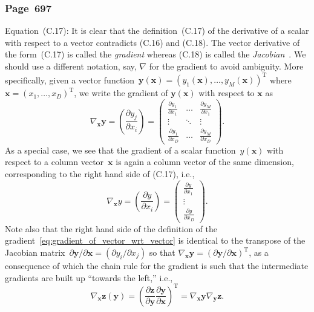 \documentclass[12pt,a4paper]{article}
\newcommand{\erratum}[1]{\subsubsection*{#1}}
\begin{document}
\erratum{Page~697}
Equation~(C.17):
It is clear that the definition~(C.17) of the derivative of a scalar with respect to a vector
contradicts (C.16) and (C.18).
The vector derivative of the form~(C.17) is called the \emph{gradient}
whereas (C.18) is called the \emph{Jacobian}~\citep{Minka:OldNewMatrixAlgebra}.
We should use a different notation, say, $\nabla$ for the gradient to avoid ambiguity.
More specifically, given a vector function~$\mathbf{y}(\mathbf{x}) =
\left(y_1(\mathbf{x}), \dots, y_M(\mathbf{x})\right)^{\operatorname{T}}$
where $\mathbf{x} = \left(x_1, \dots, x_D \right)^{\operatorname{T}}$,
we write the gradient of $\mathbf{y}(\mathbf{x})$ with respect to $\mathbf{x}$ as
\begin{equation}
\nabla_{\mathbf{x}} \mathbf{y} = \left( \frac{\partial y_j}{\partial x_i} \right) =
\begin{pmatrix}
\frac{\partial y_1}{\partial x_1} & \hdots & \frac{\partial y_M}{\partial x_1} \\
\vdots & \ddots & \vdots \\
\frac{\partial y_1}{\partial x_D} & \hdots & \frac{\partial y_M}{\partial x_D}
\end{pmatrix} .
\label{eq:gradient_of_vector_wrt_vector}
\end{equation}
As a special case, we see that the gradient of a scalar function~$y(\mathbf{x})$ with respect to
a column vector~$\mathbf{x}$ is again a column vector of the same dimension,
corresponding to the right hand side of (C.17), i.e.,
\begin{equation}
\nabla_{\mathbf{x}} y = \left( \frac{\partial y}{\partial x_i} \right) =
\begin{pmatrix}
\frac{\partial y}{\partial x_1} \\
\vdots  \\
\frac{\partial y}{\partial x_D}
\end{pmatrix} .
\end{equation}
Note also that the right hand side of the definition of
the gradient~\eqref{eq:gradient_of_vector_wrt_vector} is identical to
the transpose of the Jacobian matrix~$\partial\mathbf{y}/\partial\mathbf{x} =
\left( \partial y_i/\partial x_j \right)$
so that $\nabla_{\mathbf{x}} \mathbf{y} =
\left( \partial\mathbf{y}/\partial\mathbf{x} \right)^{\operatorname{T}}$,
as a consequence of which the chain rule for the gradient is such that the intermediate gradients
are built up ``towards the left,'' i.e.,
\begin{equation}
\nabla_{\mathbf{x}} \mathbf{z}(\mathbf{y}) =
\left(
  \frac{\partial\mathbf{z}}{\partial\mathbf{y}}
  \frac{\partial\mathbf{y}}{\partial\mathbf{x}}
\right)^{\operatorname{T}} =
\nabla_\mathbf{x} \mathbf{y} \nabla_\mathbf{y} \mathbf{z}.
\label{eq:chain_rule_for_gradient}
\end{equation}
\end{document}
